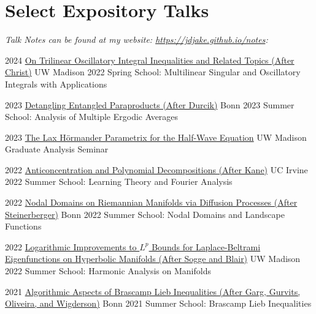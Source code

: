 \documentclass[a4paper]{cv-friggeri}
\begin{document}
\section{Select Expository Talks}

\emph{Talk Notes can be found at my website: \href{https://jdjake.github.io/notes}{https://jdjake.github.io/notes}:}
\\

\begin{entrylist}

\entry
{2024}
{\href{https://github.com/jdjake/Notes/raw/master/Talks/TalkNotes/DensonRaiChoudhuri}{On Trilinear Oscillatory Integral Inequalities and Related Topics (After Christ)}}
{}
{UW Madison 2022 Spring School: Multilinear Singular and Oscillatory Integrals with Applications}

\entry
{2023}
{\href{https://github.com/jdjake/Notes/raw/master/Talks/TalkNotes/DecouplingEntangledParaproducts.pdf}{Detangling Entangled Paraproducts (After Durcik)}}
{}
{Bonn 2023 Summer School: Analysis of Multiple Ergodic Averages}

\entry
{2023}
{\href{https://github.com/jdjake/Notes/raw/master/Talks/TalkNotes/LaxParametrix.pdf}{The Lax H\"{o}rmander Parametrix for the Half-Wave Equation}}
{}
{UW Madison Graduate Analysis Seminar}

\entry
{2022}
{\href{https://github.com/jdjake/Notes/raw/master/Talks/TalkNotes/AnticoncentrationPolynomialDecompositions.pdf}{Anticoncentration and Polynomial Decompositions (After Kane)}}
{}
{UC Irvine 2022 Summer School: Learning Theory and Fourier Analysis}

\entry
{2022}
{\href{https://github.com/jdjake/Notes/raw/master/Talks/TalkNotes/NodalGeometryAndBrownianMotion.pdf}{Nodal Domains on Riemannian Manifolds via Diffusion Processes (After Steinerberger)}}
{}
{Bonn 2022 Summer School: Nodal Domains and Landscape Functions}

\entry
{2022}
{\href{https://github.com/jdjake/Notes/raw/master/Talks/TalkNotes/LogarithmicImprovementsSpectralBands.pdf}{Logarithmic Improvements to $L^p$ Bounds for Laplace-Beltrami Eigenfunctions on Hyperbolic Manifolds (After Sogge and Blair)}}
{}
{UW Madison 2022 Summer School: Harmonic Analysis on Manifolds}

\entry
{2021}
{\href{https://github.com/jdjake/Notes/raw/master/Talks/TalkNotes/RankDecreasingAndCapacity.pdf}{Algorithmic Aspects of Brascamp Lieb Inequalities (After Garg, Gurvits, Oliveira, and Wigderson)}}
{}
{Bonn 2021 Summer School: Brascamp Lieb Inequalities}


\end{entrylist}
\end{document}
